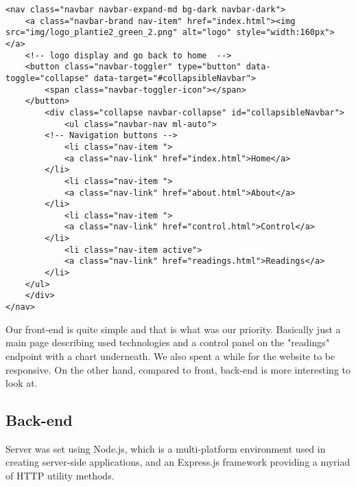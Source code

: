 \documentclass[oneside,a4paper,11pt]{report}
\begin{document}
\begin{lstlisting}[style=HTML5]
<nav class="navbar navbar-expand-md bg-dark navbar-dark">
	<a class="navbar-brand nav-item" href="index.html"><img src="img/logo_plantie2_green_2.png" alt="logo" style="width:160px"></a>
	<!-- logo display and go back to home  -->
	<button class="navbar-toggler" type="button" data-toggle="collapse" data-target="#collapsibleNavbar">
		<span class="navbar-toggler-icon"></span>
	</button>
     	<div class="collapse navbar-collapse" id="collapsibleNavbar">
            <ul class="navbar-nav ml-auto">
		<!-- Navigation buttons -->
			<li class="nav-item ">
			<a class="nav-link" href="index.html">Home</a>
		</li>
			<li class="nav-item ">
			<a class="nav-link" href="about.html">About</a>
		</li>
			<li class="nav-item ">
			<a class="nav-link" href="control.html">Control</a>
		</li>
			<li class="nav-item active">
			<a class="nav-link" href="readings.html">Readings</a>
		</li>
	</ul>
	</div>
</nav>
\end{lstlisting}
\hspace{1cm}Our front-end is quite simple and that is what was our priority. Basically just a main page describing used technologies and a control panel on the "readings" endpoint with a chart underneath. We also spent a while for the website to be responsive. On the other hand, compared to front, back-end is more interesting to look at.
\subsection{Back-end}
\hspace{1cm}Server was set using Node.js, which is a multi-platform environment used in creating server-side applications, and an Express.js framework providing a myriad of HTTP utility methods.
\end{document}
